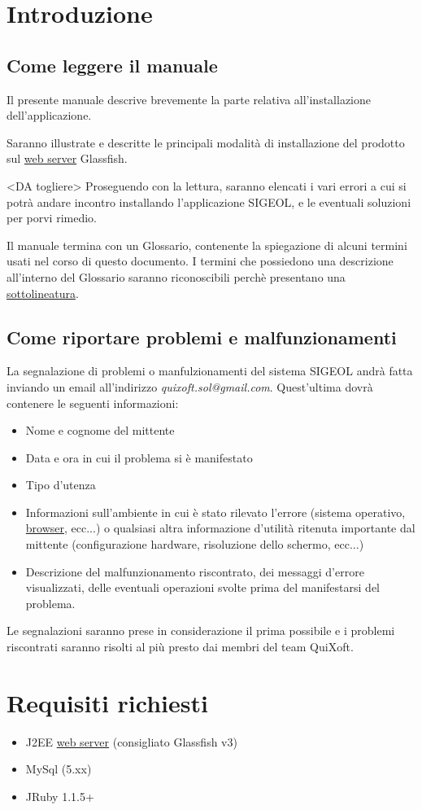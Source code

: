 \documentclass[11pt,a4paper]{article}
\begin{document}
\section{Introduzione}
\subsection{Come leggere il manuale}
Il presente manuale descrive brevemente la parte relativa all'installazione dell'applicazione.

Saranno illustrate e descritte le principali modalità di installazione del prodotto sul \underline{web server} Glassfish.

<DA togliere>
Proseguendo con la lettura, saranno elencati i vari errori a cui si potrà andare incontro installando l'applicazione SIGEOL, e le eventuali soluzioni per porvi rimedio.

Il manuale termina con un Glossario, contenente la spiegazione di alcuni termini usati nel corso di questo documento.
I termini che possiedono una descrizione all'interno del Glossario saranno riconoscibili perchè presentano una \underline{sottolineatura}.

\subsection{Come riportare problemi e malfunzionamenti}
La segnalazione di problemi o manfulzionamenti del sistema SIGEOL andrà fatta inviando un email all'indirizzo \textit{quixoft.sol@gmail.com}.
Quest'ultima dovrà contenere le seguenti informazioni:
\begin{itemize}
 \item Nome e cognome del mittente
 \item Data e ora in cui il problema si è manifestato
 \item Tipo d'utenza
 \item Informazioni sull'ambiente in cui è stato rilevato l'errore (sistema operativo, \underline{browser}, ecc...) o qualsiasi altra informazione d'utilità ritenuta importante dal mittente (configurazione hardware, risoluzione dello schermo, ecc...)
 \item Descrizione del malfunzionamento riscontrato, dei messaggi d'errore visualizzati, delle eventuali operazioni svolte prima del manifestarsi del problema.
\end{itemize}
Le segnalazioni saranno prese in considerazione il prima possibile e i problemi riscontrati saranno risolti al più presto dai membri del team QuiXoft.
\section{Requisiti richiesti}
\begin{itemize}
 \item J2EE \underline{web server} (consigliato Glassfish v3)
 \item MySql (5.xx)
 \item JRuby 1.1.5+ 
\end{itemize}
\bigskip
\end{document}
